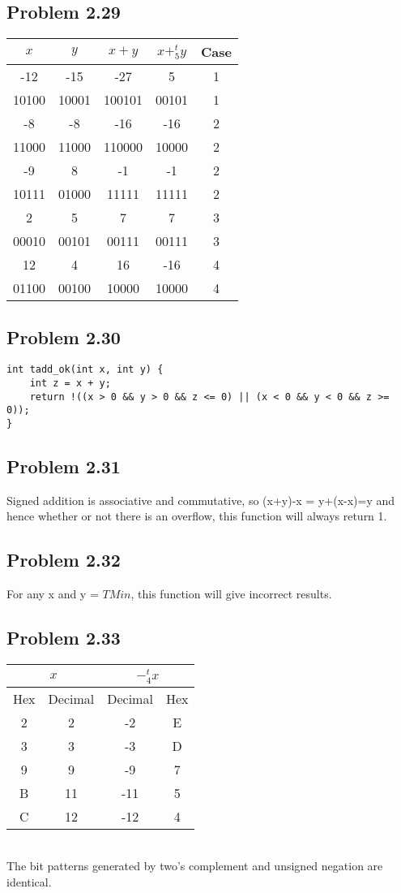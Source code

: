 \documentclass[a4paper]{article}
\begin{document}
\subsection*{Problem 2.29}
\begin{tabular}{ccccc}
    $x$&$y$&$x+y$&$x+^t_5y$&Case\\
    \hline
    -12&-15&-27&5&1\\
    10100&10001&100101&00101&1\\
    -8&-8&-16&-16&2\\
    11000&11000&110000&10000&2\\
    -9&8&-1&-1&2\\
    10111&01000&11111&11111&2\\
    2&5&7&7&3\\
    00010&00101&00111&00111&3\\
    12&4&16&-16&4\\
    01100&00100&10000&10000&4
\end{tabular}

\subsection*{Problem 2.30}
\begin{lstlisting}
int tadd_ok(int x, int y) {
    int z = x + y;
    return !((x > 0 && y > 0 && z <= 0) || (x < 0 && y < 0 && z >= 0));
}
\end{lstlisting}

\subsection*{Problem 2.31}
Signed addition is associative and commutative, so (x+y)-x = y+(x-x)=y and hence whether or not there is an overflow, this function will always return 1.

\subsection*{Problem 2.32}
For any x and y = $TMin$, this function will give incorrect results.

\subsection*{Problem 2.33}
\begin{tabular}{c|c|c|c}
    \multicolumn{2}{c|}{$x$}&\multicolumn{2}{c}{$-^t_4x$}\\
    \hline
    Hex&Decimal&Decimal&Hex\\
    \hline
    2&2&-2&E\\
    3&3&-3&D\\
    9&9&-9&7\\
    B&11&-11&5\\
    C&12&-12&4\\

\end{tabular}\\
The bit patterns generated by two's complement and unsigned negation are identical.
\end{document}
